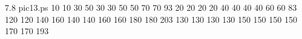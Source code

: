  7.8 pic13.ps 
{}{}{
 10 
 10 
 30 
 50 
 30 
 30 
 50 
 50 
 70 
 70 
 93 
 20 
 20 
 20 
 20 
 40 
 40 
 40 
 40 
 60 
 60 
 83 
 120 
 120 
 140 
 160 
 140 
 140 
 160 
 160 
 180 
 180 
 203 
 130 
 130 
 130 
 130 
 150 
 150 
 150 
 150 
 170 
 170 
 193 
}

